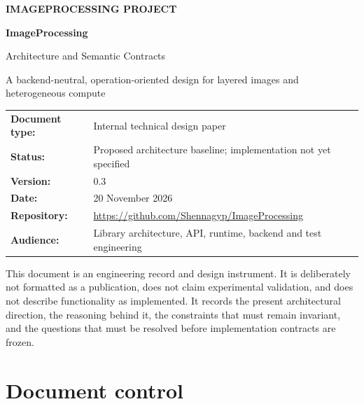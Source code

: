 \documentclass[11pt,a4paper,oneside]{article}
\begin{document}
\begin{titlepage}
  \centering
  \vspace*{18mm}
  {\Large\bfseries IMAGEPROCESSING PROJECT\par}
  \vspace{13mm}
  {\huge\bfseries ImageProcessing\par}
  \vspace{3mm}
  {\LARGE Architecture and Semantic Contracts\par}
  \vspace{9mm}
  {\large A backend-neutral, operation-oriented design for layered images and heterogeneous compute\par}
  \vfill
  \begin{tabular}{@{}ll@{}}
    \textbf{Document type:} & Internal technical design paper \\
    \textbf{Status:} & Proposed architecture baseline; implementation not yet specified \\
    \textbf{Version:} & 0.3 \\
    \textbf{Date:} & 20 November 2026 \\
    \textbf{Repository:} & \url{https://github.com/Shennagyp/ImageProcessing} \\
    \textbf{Audience:} & Library architecture, API, runtime, backend and test engineering \\
  \end{tabular}
  \vfill
  \begin{minipage}{0.86\textwidth}
    \small\color{muted}
    This document is an engineering record and design instrument. It is deliberately not formatted as a publication, does not claim experimental validation, and does not describe functionality as implemented. It records the present architectural direction, the reasoning behind it, the constraints that must remain invariant, and the questions that must be resolved before implementation contracts are frozen.
  \end{minipage}
  \vspace*{13mm}
\end{titlepage}

\tableofcontents
\clearpage
{}

\section*{Document control}
\end{document}
